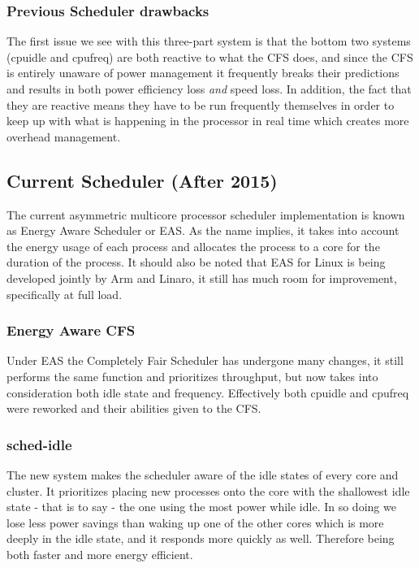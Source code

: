 \subsubsection{Previous Scheduler drawbacks}
The first issue we see with this three-part system is that the bottom two systems (cpuidle and cpufreq) are both reactive to what the CFS does, and since the CFS is entirely unaware of power management it frequently breaks their predictions and results in both power efficiency loss \textit{and} speed loss. In addition, the fact that they are reactive means they have to be run frequently themselves in order to keep up with what is happening in the processor in real time which creates more overhead management. \cite{EAS2015}

\subsection{Current Scheduler (After 2015)}
The current asymmetric multicore processor scheduler implementation is known as Energy Aware Scheduler or EAS. As the name implies, it takes into account the energy usage of each process and allocates the process to a core for the duration of the process. It should also be noted that EAS for Linux is being developed jointly by Arm and Linaro, it still has much room for improvement, specifically at full load.\cite{EASp2015}

\subsubsection{Energy Aware CFS}
Under EAS the Completely Fair Scheduler has undergone many changes, it still performs the same function and prioritizes throughput, but now takes into consideration both idle state and frequency. Effectively both cpuidle and cpufreq were reworked and their abilities given to the CFS.\cite{EASp2015}

\subsubsection{sched-idle}
The new system makes the scheduler aware of the idle states of every core and cluster. It prioritizes placing new processes onto the core with the shallowest idle state - that is to say - the one using the most power while idle. In so doing we lose less power savings than waking up one of the other cores which is more deeply in the idle state, and it responds more quickly as well. Therefore being both faster and more energy efficient. \cite{EASp2015}

